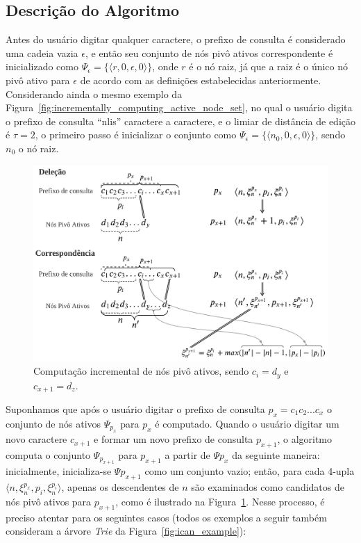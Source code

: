 \subsection{Descrição do Algoritmo}
\label{sec:icpan_algorithm_description}

Antes do usuário digitar qualquer caractere, o prefixo de consulta é considerado uma cadeia vazia $\epsilon$, e então seu conjunto de nós pivô ativos correspondente é inicializado como $\Psi_{\epsilon} = \{ \langle r, 0, \epsilon, 0 \rangle \}$, onde $r$ é o nó raiz, já que a raiz é o único nó pivô ativo para $\epsilon$ de acordo com as definições estabelecidas anteriormente. Considerando ainda o mesmo exemplo da Figura~\ref{fig:incrementally_computing_active_node_set}, no qual o usuário digita o prefixo de consulta ``nlis'' caractere a caractere, e o limiar de distância de edição é $\tau = 2$, o primeiro passo é inicializar o conjunto como $\Psi_{\epsilon} = \{ \langle n_{0}, 0, \epsilon, 0 \rangle \}$, sendo $n_{0}$ o nó raiz. 

\begin{figure}[ht]
    \centering
    \includegraphics[width=1\textwidth]{figures/incrementally_computing_pivotal_nodes.png}
    \caption{Computação incremental de nós pivô ativos, sendo $c_{i} = d_{y}$ e $c_{x+1} = d_{z}$.}
    \label{fig:incrementally_computing_pivotal_nodes}
\end{figure}

Suponhamos que após o usuário digitar o prefixo de consulta $p_{x} = c_{1}c_{2}...c_{x}$ o conjunto de nós ativos $\Psi_{p_{x}}$ para $p_{x}$ é computado. Quando o usuário digitar um novo caractere $c_{x+1}$ e formar um novo prefixo de consulta $p_{x+1}$, o algoritmo computa o conjunto $\Psi_{p_{x+1}}$ para $p_{x+1}$ a partir de $\Psi{p_{x}}$ da seguinte maneira: inicialmente, inicializa-se $\Psi{p_{x+1}}$ como um conjunto vazio; então, para cada 4-upla $ \langle n, \xi_{n}^{p_{x}}, p_{i}, \xi_{n}^{p_{i}} \rangle$, apenas os descendentes de $n$ são examinados como candidatos de nós pivô ativos para $p_{x+1}$, como é ilustrado na Figura~\ref{fig:incrementally_computing_pivotal_nodes}. Nesse processo, é preciso atentar para os seguintes casos (todos os exemplos a seguir também consideram a árvore \textit{Trie} da Figura~\ref{fig:ican_example}):

